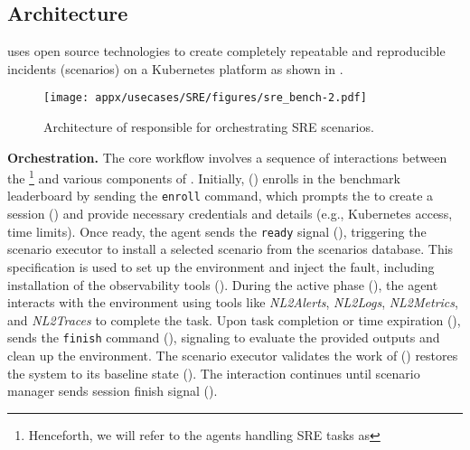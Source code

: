 \subsection{\bench Architecture}
\label{ss:sre-bench}
\bench uses open source technologies to create completely repeatable and reproducible incidents (scenarios) on a Kubernetes platform as shown in . 
\begin{figure*}[t!]
    \centering
    \texttt{[image: appx/usecases/SRE/figures/sre\_bench-2.pdf]}
    \caption{Architecture of \bench responsible for orchestrating SRE  scenarios.}
    \label{fig:bench_design}
\end{figure*}

\textbf{Orchestration.}
The core workflow involves a sequence of interactions between the \lumyn\footnote{Henceforth, we will refer to the agents handling SRE tasks as \lumyn} and various components of \bench. 
Initially, \lumyn () enrolls in the benchmark leaderboard by sending the \texttt{enroll} command, which prompts the \bench to create a session () and provide necessary credentials and details (e.g., Kubernetes access, time limits). 
Once ready, the agent sends the \texttt{ready} signal (), triggering the scenario executor to install a selected scenario from the scenarios database. 
This specification is used to set up the environment and  inject the fault, including installation of the observability tools ().
During the active phase (), the agent interacts with the environment using tools like \textit{NL2Alerts}, \textit{NL2Logs}, \textit{NL2Metrics}, and \textit{NL2Traces} to complete the task.
Upon task completion or time expiration (), \lumyn sends the \texttt{finish} command (), signaling \bench to evaluate the provided outputs and clean up the environment. 
The scenario executor validates the work of \lumyn () restores the system to its baseline state ().
The interaction  \textemdash {} continues until scenario manager sends session finish signal (). 

